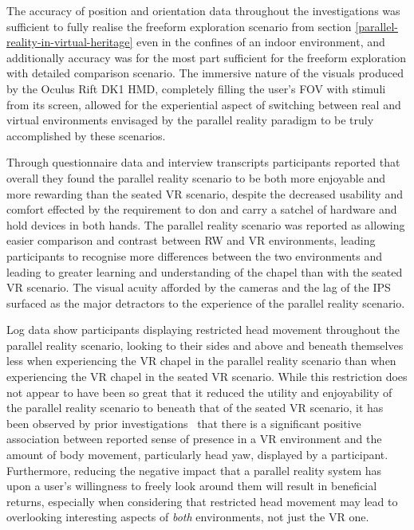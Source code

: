 The accuracy of position and orientation data throughout the investigations was sufficient to fully realise the freeform exploration scenario from section \ref{parallel-reality-in-virtual-heritage} even in the confines of an indoor environment, and additionally accuracy was for the most part sufficient for the freeform exploration with detailed comparison scenario. The immersive nature of the visuals produced by the Oculus Rift DK1 HMD, completely filling the user's FOV with stimuli from its screen, allowed for the experiential aspect of switching between real and virtual environments envisaged by the parallel reality paradigm to be truly accomplished by these scenarios.

Through questionnaire data and interview transcripts participants reported that overall they found the parallel reality scenario to be both more enjoyable and more rewarding than the seated VR scenario, despite the decreased usability and comfort effected by the requirement to don and carry a satchel of hardware and hold devices in both hands. The parallel reality scenario was reported as allowing easier comparison and contrast between RW and VR environments, leading participants to recognise more differences between the two environments and leading to greater learning and understanding of the chapel than with the seated VR scenario. The visual acuity afforded by the cameras and the lag of the IPS surfaced as the major detractors to the experience of the parallel reality scenario.

Log data show participants displaying restricted head movement throughout the parallel reality scenario, looking to their sides and above and beneath themselves less when experiencing the VR chapel in the parallel reality scenario than when experiencing the VR chapel in the seated VR scenario. While this restriction does not appear to have been so great that it reduced the utility and enjoyability of the parallel reality scenario to beneath that of the seated VR scenario, it has been observed by prior investigations~\cite{Slater1998} that there is a significant positive association between reported sense of presence in a VR environment and the amount of body movement, particularly head yaw, displayed by a participant. Furthermore, reducing the negative impact that a parallel reality system has upon a user's willingness to freely look around them will result in beneficial returns, especially when considering that restricted head movement may lead to overlooking interesting aspects of \textit{both} environments, not just the VR one.

